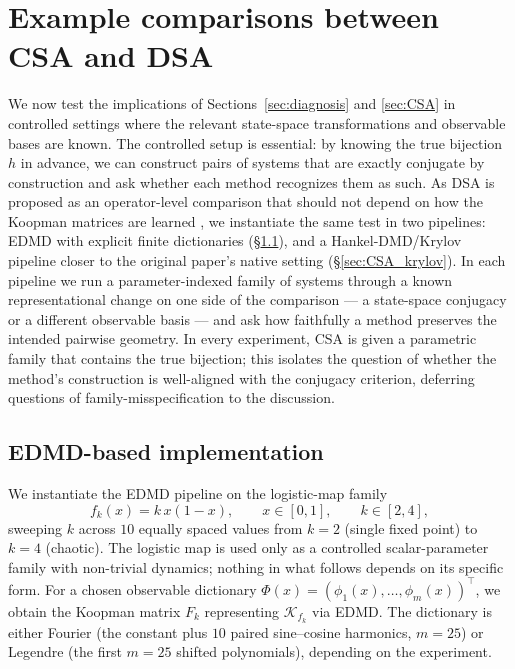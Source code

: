 \documentclass{article}
\theoremstyle{definition}
\begin{document}
\section{Example comparisons between CSA and DSA}
\label{sec:results}

We now test the implications of Sections~\ref{sec:diagnosis} and \ref{sec:CSA} in controlled settings where the relevant state-space transformations and observable bases are known. The controlled setup is essential: by knowing the true bijection $h$ in advance, we can construct pairs of systems that are exactly conjugate by construction and ask whether each method recognizes them as such. As DSA is proposed as an operator-level comparison that should not depend on how the Koopman matrices are learned \citep{ostrow2023beyond}, we instantiate the same test in two pipelines: EDMD with explicit finite dictionaries (\S\ref{sec:results_edmd}), and a Hankel-DMD/Krylov pipeline closer to the original paper's native setting (\S\ref{sec:CSA_krylov}). In each pipeline we run a parameter-indexed family of systems through a known representational change on one side of the comparison --- a state-space conjugacy or a different observable basis --- and ask how faithfully a method preserves the intended pairwise geometry. In every experiment, CSA is given a parametric family that contains the true bijection; this isolates the question of whether the method's construction is well-aligned with the conjugacy criterion, deferring questions of family-misspecification to the discussion.


\subsection{EDMD-based implementation}
\label{sec:results_edmd}

We instantiate the EDMD pipeline on the logistic-map family
\[
    f_k(x)=k\,x(1-x),
    \qquad x\in[0,1],
    \qquad k\in[2,4],
\]
sweeping $k$ across $10$ equally spaced values from $k=2$ (single fixed point) to $k=4$ (chaotic). The logistic map is used only as a controlled scalar-parameter family with non-trivial dynamics; nothing in what follows depends on its specific form. For a chosen observable dictionary $\Phi(x)=(\phi_1(x),\ldots,\phi_m(x))^\top$, we obtain the Koopman matrix $F_k$ representing $\mathcal K_{f_k}$ via EDMD. The dictionary is either Fourier (the constant plus $10$ paired sine--cosine harmonics, $m=25$) or Legendre (the first $m=25$ shifted polynomials), depending on the experiment.
\end{document}
